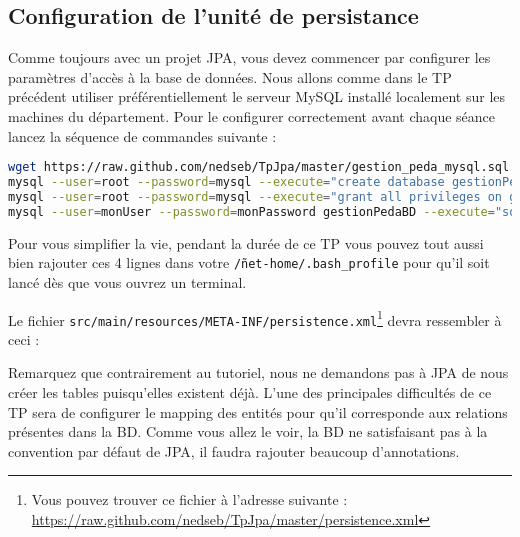 \documentclass[a4paper,11pt]{article}
\begin{document}
\subsection{Configuration de l'unité de persistance}
Comme toujours avec un projet JPA, vous devez commencer par configurer les paramètres d'accès à la base de données.
Nous allons comme dans le TP précédent utiliser préférentiellement le serveur MySQL installé localement sur les machines 
du département. Pour le configurer correctement avant chaque séance lancez la séquence de commandes suivante :
\begin{lstlisting}[language=sh,style=customsh]
wget https://raw.github.com/nedseb/TpJpa/master/gestion_peda_mysql.sql -O ~/net-home/gestion_peda_mysql.sql
mysql --user=root --password=mysql --execute="create database gestionPedaBD"
mysql --user=root --password=mysql --execute="grant all privileges on gestionPedaBD.* to monUser@localhost identified by 'monPassword'"
mysql --user=monUser --password=monPassword gestionPedaBD --execute="source ~/net-home/gestion_peda_mysql.sql"
\end{lstlisting}
Pour vous simplifier la vie, pendant la durée de ce TP vous pouvez tout aussi bien rajouter ces 4 lignes dans 
votre \texttt{\~/net-home/.bash\_profile} pour qu'il soit lancé dès que vous ouvrez un terminal.


Le fichier \texttt{src/main/resources/META-INF/persistence.xml}\footnote{Vous pouvez trouver ce fichier 
à l'adresse suivante : \url{https://raw.github.com/nedseb/TpJpa/master/persistence.xml}} devra ressembler à ceci :



Remarquez que contrairement au tutoriel, nous ne demandons pas à JPA de nous créer les tables puisqu'elles existent déjà.
L'une des principales difficultés de ce TP sera de configurer le mapping des entités pour qu'il corresponde aux relations 
présentes dans la BD. Comme vous allez le voir, la BD ne satisfaisant pas à la convention par défaut de JPA,
il faudra rajouter beaucoup d'annotations.
\end{document}
